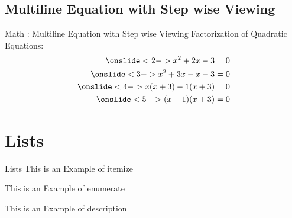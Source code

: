 \documentclass{beamer}
\begin{document}
\subsection{Multiline Equation with Step wise Viewing} %
\begin{frame}[label=Multiline Equations]{Math : Multiline Equation with Step wise Viewing}
\transblindshorizontal
    Factorization of Quadratic Equations:
    \begin{eqnarray*}
        \onslide<2->x^2 + 2x - 3 = 0 \\
        \onslide<3->x^2 + 3x - x - 3 = 0 \\
        \onslide<4->x(x+3) -1(x+3) = 0 \\
        \onslide<5->(x-1)(x+3) = 0 
    \end{eqnarray*}
    
\end{frame}



\section{Lists}   %
\begin{frame}[label= Lists]{Lists}
\transblindshorizontal
    \alert<1>{This is an Example of itemize}
    \begin{itemize}
    \end{itemize}
    \alert<2>{This is an Example of enumerate}
    \begin{enumerate}
    \end{enumerate}
    
    \alert<3>{This is an Example of description}
    \begin{description}
    \end{description}
\end{frame}
\end{document}

